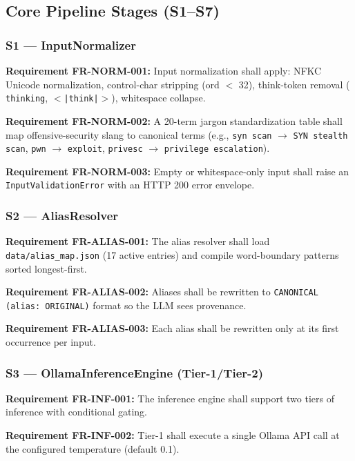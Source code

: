 \documentclass[10pt,journal,onecolumn]{IEEEtran}
\newcommand{\reqid}[1]{\textbf{#1}}
\begin{document}
\subsection{Core Pipeline Stages (S1--S7)}

\subsubsection{S1 --- InputNormalizer}
\reqid{Requirement FR-NORM-001:} Input normalization shall apply: NFKC Unicode normalization, control-char stripping (ord $<$ 32), think-token removal (\texttt{ thinking}, \texttt{$<$|think|$>$}), whitespace collapse.

\reqid{Requirement FR-NORM-002:} A 20-term jargon standardization table shall map offensive-security slang to canonical terms (e.g., \texttt{syn scan} $\rightarrow$ \texttt{SYN stealth scan}, \texttt{pwn} $\rightarrow$ \texttt{exploit}, \texttt{privesc} $\rightarrow$ \texttt{privilege escalation}).

\reqid{Requirement FR-NORM-003:} Empty or whitespace-only input shall raise an \texttt{InputValidationError} with an HTTP 200 error envelope.

\subsubsection{S2 --- AliasResolver}
\reqid{Requirement FR-ALIAS-001:} The alias resolver shall load \texttt{data/alias\_map.json} (17 active entries) and compile word-boundary patterns sorted longest-first.

\reqid{Requirement FR-ALIAS-002:} Aliases shall be rewritten to \texttt{CANONICAL (alias: ORIGINAL)} format so the LLM sees provenance.

\reqid{Requirement FR-ALIAS-003:} Each alias shall be rewritten only at its first occurrence per input.

\subsubsection{S3 --- OllamaInferenceEngine (Tier-1/Tier-2)}
\reqid{Requirement FR-INF-001:} The inference engine shall support two tiers of inference with conditional gating.

\reqid{Requirement FR-INF-002:} Tier-1 shall execute a single Ollama API call at the configured temperature (default 0.1).
\end{document}
